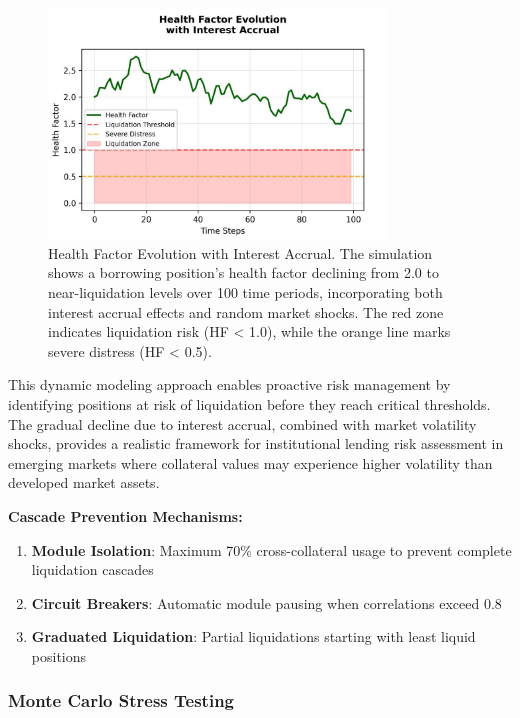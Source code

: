 \documentclass[12pt]{article}
\begin{document}
\begin{figure}[h]
    \centering
    \includegraphics[width=0.8\textwidth]{health_factor_evaluation.jpeg}
    \caption{Health Factor Evolution with Interest Accrual. The simulation shows a borrowing position's health factor declining from 2.0 to near-liquidation levels over 100 time periods, incorporating both interest accrual effects and random market shocks. The red zone indicates liquidation risk (HF < 1.0), while the orange line marks severe distress (HF < 0.5).}
    \label{fig:health_factor_evolution}
\end{figure}

This dynamic modeling approach enables proactive risk management by identifying positions at risk of liquidation before they reach critical thresholds. The gradual decline due to interest accrual, combined with market volatility shocks, provides a realistic framework for institutional lending risk assessment in emerging markets where collateral values may experience higher volatility than developed market assets.


\textbf{Cascade Prevention Mechanisms:}
\begin{enumerate}
\item \textbf{Module Isolation}: Maximum 70\% cross-collateral usage to prevent complete liquidation cascades
\item \textbf{Circuit Breakers}: Automatic module pausing when correlations exceed 0.8
\item \textbf{Graduated Liquidation}: Partial liquidations starting with least liquid positions
\end{enumerate}

\subsubsection{Monte Carlo Stress Testing}
\end{document}

